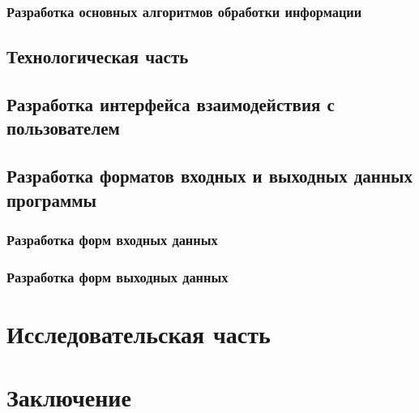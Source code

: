 \documentclass[russian,utf8,emptystyle]{eskdtext}
\begin{document}
\subsubsection{Разработка основных алгоритмов обработки информации}

\newpage
\subsection{Технологическая часть}
\subsection{Разработка интерфейса взаимодействия с пользователем}

\subsection{Разработка форматов входных и выходных данных программы}
\subsubsection{Разработка форм входных данных}

\subsubsection{Разработка форм выходных данных}

\newpage
\section{Исследовательская часть}

\newpage
\section{Заключение}

\newpage
\end{document}
